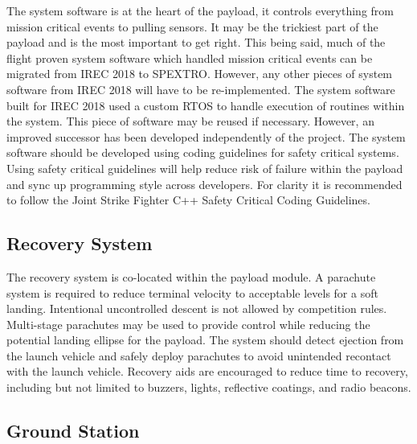\documentclass[conference]{IEEEtran} %
\begin{document}
The system software is at the heart of the payload, it controls everything from mission critical events to pulling sensors. It may be the trickiest part of the payload and is the most important to get right. This being said, much of the flight proven system software which handled mission critical events can be migrated from IREC 2018 to SPEXTRO. However, any other pieces of system software from IREC 2018 will have to be re-implemented. The system software built for IREC 2018 used a custom RTOS to handle execution of routines within the system. This piece of software may be reused if necessary. However, an improved successor has been developed independently of the project. The system software should be developed using coding guidelines for safety critical systems. Using safety critical guidelines will help reduce risk of failure within the payload and sync up programming style across developers. For clarity it is recommended to follow the Joint Strike Fighter C++ Safety Critical Coding Guidelines. 

\subsection{Recovery System}
\label{subsec:recovery}

The recovery system is co-located within the payload module. A parachute system is required to reduce terminal velocity to acceptable levels for a soft landing. Intentional uncontrolled descent is not allowed by competition rules. Multi-stage parachutes may be used to provide control while reducing the potential landing ellipse for the payload. The system should detect ejection from the launch vehicle  and safely deploy parachutes to avoid unintended recontact with the launch vehicle. Recovery aids are encouraged to reduce time to recovery, including but not limited to buzzers, lights, reflective coatings, and radio beacons.

\subsection{Ground Station}
\label{subsec:ground}
\end{document}
